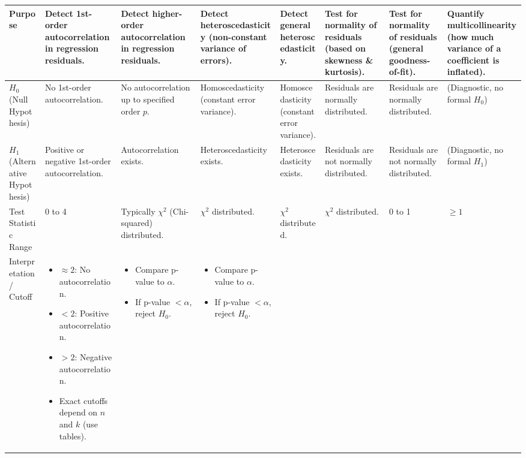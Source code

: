 \documentclass[10pt]{article}
\begin{document}
\begin{longtable}{|L{3.8cm}|L{3.0cm}|L{3.0cm}|L{3.0cm}|L{3.0cm}|L{3.0cm}|L{3.0cm}|L{3.0cm}|}
		Purpose & Detect 1st-order autocorrelation in regression residuals. & Detect
		higher-order autocorrelation in regression residuals. & Detect heteroscedasticity
		(non-constant variance of errors). & Detect general heteroscedasticity. & Test for
		normality of residuals (based on skewness \& kurtosis). & Test for normality of
		residuals (general goodness-of-fit). & Quantify multicollinearity (how much variance of
		a coefficient is inflated). \\
		\hline
		$H_0$ (Null Hypothesis) & No 1st-order autocorrelation. & No autocorrelation up to
		specified order $p$. & Homoscedasticity (constant error variance). & Homoscedasticity
		(constant error variance). & Residuals are normally distributed. & Residuals are
		normally distributed. & (Diagnostic, no formal $H_0$) \\
		\hline
		$H_1$ (Alternative Hypothesis) & Positive or negative 1st-order autocorrelation. &
		Autocorrelation exists. & Heteroscedasticity exists. & Heteroscedasticity exists. &
		Residuals are not normally distributed. & Residuals are not normally distributed. &
		(Diagnostic, no formal $H_1$) \\
		\hline
		Test Statistic Range & 0 to 4 & Typically $\chi^2$ (Chi-squared) distributed. &
		$\chi^2$ distributed. & $\chi^2$ distributed. & $\chi^2$ distributed. & 0 to 1 & $\ge 1$ \\
		\hline
		Interpretation / Cutoff &
		\begin{itemize}[nosep, leftmargin=*, topsep=0pt, partopsep=0pt]
				\item $\approx 2$: No autocorrelation.
				\item $< 2$: Positive autocorrelation.
				\item $> 2$: Negative autocorrelation.
				\item Exact cutoffs depend on $n$ and $k$ (use tables).
		\end{itemize} &
		\begin{itemize}[nosep, leftmargin=*, topsep=0pt, partopsep=0pt]
				\item Compare p-value to $\alpha$.
				\item If p-value $<\alpha$, reject $H_0$.
		\end{itemize} &
		\begin{itemize}[nosep, leftmargin=*, topsep=0pt, partopsep=0pt]
				\item Compare p-value to $\alpha$.
				\item If p-value $<\alpha$, reject $H_0$.

\end{itemize}
\end{longtable}
\end{document}
